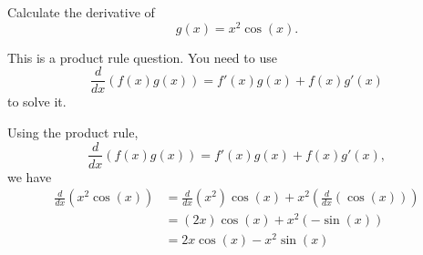 \documentclass{ximera}
\author{Emma Smith Zbarsky}
\begin{document}
\begin{exercise}

Calculate the derivative of \[g(x) = x^2\cos(x).\]


\begin{hint}
This is a product rule question. You need to use
\[\frac{d}{dx}\left(f(x)g(x)\right) = f'(x)g(x)+f(x)g'(x)\] to solve it.
\end{hint}


\begin{hint}
Using the product rule,
\[\frac{d}{dx}\left(f(x)g(x)\right) = f'(x)g(x)+f(x)g'(x),\] we have
\begin{align*} \frac{d}{dx}\left(x^2\cos(x)\right) &= \frac{d}{dx}(x^2)\cos(x)+x^2\left(\frac{d}{dx}\left(\cos(x)\right)\right) \\
&= \left(2x\right)\cos(x) + x^2\left(-\sin(x)\right) \\
&= \boxed{2x\cos(x)-x^2\sin(x)}
\end{align*}
\end{hint}


\begin{multipleChoice}
\end{multipleChoice}

\end{exercise}
\end{document}
